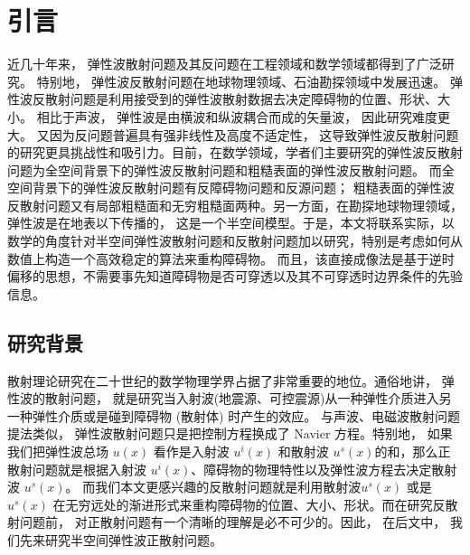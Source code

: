 \chapter{引言}\label{chap:introduction}
近几十年来， 弹性波散射问题及其反问题在工程领域和数学领域都得到了广泛研究\cite{landau}。 特别地， 弹性波反散射问题在地球物理领域、石油勘探领域中发展迅速。
弹性波反散射问题是利用接受到的弹性波散射数据去决定障碍物的位置、形状、大小。 相比于声波， 弹性波是由横波和纵波耦合而成的矢量波， 因此研究难度更大。 又因为反问题普遍具有强非线性及高度不适定性， 这导致弹性波反散射问题的研究更具挑战性和吸引力。目前，在数学领域，学者们主要研究的弹性波反散射问题为全空间背景下的弹性波反散射问题\cite{bonnet2005inverse,bao2018inverse}和粗糙表面的弹性波反散射问题\cite{liu2019near}。 而全空间背景下的弹性波反散射问题有反障碍物问题和反源问题； 粗糙表面的弹性波反散射问题又有局部粗糙面和无穷粗糙面两种。另一方面，在勘探地球物理领域， 弹性波是在地表以下传播的， 这是一个半空间模型。于是，本文将联系实际，以数学的角度针对半空间弹性波散射问题和反散射问题加以研究，特别是考虑如何从数值上构造一个高效稳定的算法来重构障碍物。 而且，该直接成像法是基于逆时偏移的思想，不需要事先知道障碍物是否可穿透以及其不可穿透时边界条件的先验信息。
\section{研究背景}
 散射理论研究在二十世纪的数学物理学界占据了非常重要的地位。通俗地讲， 弹性波的散射问题， 就是研究当入射波(地震源、可控震源)从一种弹性介质进入另一种弹性介质或是碰到障碍物 (散射体) 时产生的效应。 与声波、电磁波散射问题提法类似， 弹性波散射问题只是把控制方程换成了 Navier 方程。特别地， 如果我们把弹性波总场 $u(x)$ 看作是入射波 $u^i(x)$ 和散射波 $u^s(x)$的和，那么正散射问题就是根据入射波 $u^i(x)$、障碍物的物理特性以及弹性波方程去决定散射波 $u^s(x)$。 而我们本文更感兴趣的反散射问题就是利用散射波$u^s(x)$ 或是 $u^s(x)$ 在无穷远处的渐进形式来重构障碍物的位置、大小、形状。而在研究反散射问题前， 对正散射问题有一个清晰的理解是必不可少的。因此， 在后文中， 我们先来研究半空间弹性波正散射问题。
